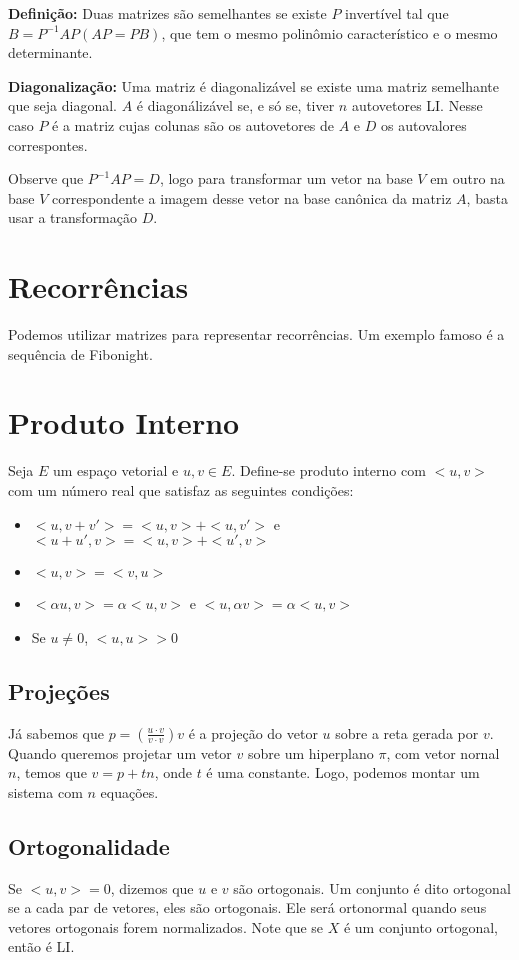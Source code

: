 \documentclass[12pt,letterpaper]{article}
\begin{document}
\textbf{Definição:} Duas matrizes são semelhantes se existe $P$ invertível tal que $B = P^{-1}AP (AP = PB)$, que tem o mesmo polinômio característico e o mesmo determinante. 

\textbf{Diagonalização:} Uma matriz é diagonalizável se existe uma matriz semelhante que seja diagonal. $A$ é diagonálizável se, e só se, tiver $n$ autovetores LI. Nesse caso $P$ é a matriz cujas colunas são os autovetores de $A$ e $D$ os autovalores correspontes. 

Observe que $P^{-1}AP = D$, logo para transformar um vetor na base $V$ em outro na base $V$ correspondente a imagem desse vetor na base canônica da matriz $A$, basta usar a transformação $D$. 

\section{Recorrências}

Podemos utilizar matrizes para representar recorrências. Um exemplo famoso é a sequência de Fibonight. 

\section{Produto Interno}

Seja $E$ um espaço vetorial e $u, v \in E$. Define-se produto interno com $<u,v>$ com um número real 
que satisfaz as seguintes condições:
\begin{itemize}
  \item $<u,v + v'> = <u,v> + <u,v'>$ e $<u + u',v> = <u,v> + <u',v>$
  \item $<u,v> = <v,u>$
  \item $<\alpha u,v> = \alpha<u,v>$ e $<u,\alpha v> = \alpha<u,v>$
  \item Se $u \neq 0$, $<u,u> > 0$
\end{itemize}

\subsection{Projeções}

Já sabemos que $p = (\frac{u\cdot v}{v\cdot v})v$ é a projeção do vetor $u$ sobre a reta gerada por $v$.
Quando queremos projetar um vetor $v$ sobre um hiperplano $\pi$, com vetor nornal $n$, temos que $v = p + tn$, 
onde $t$ é uma constante. Logo, podemos montar um sistema com $n$ equações. 

\subsection{Ortogonalidade} 
Se $<u,v> = 0$, dizemos que $u$ e $v$ são ortogonais. Um conjunto é dito ortogonal se a cada par de vetores, eles são ortogonais.
Ele será ortonormal quando seus vetores ortogonais forem normalizados. Note que se $X$ é um conjunto ortogonal, então é LI. 
\end{document}
